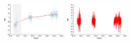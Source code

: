 \documentclass[landscape,a0paper,fontscale=0.346]{baposter} %
\begin{document}
\begin{poster}
{\begin{minipage}[c]{0.33\linewidth}
  \includegraphics[height=5em]{048a_2_data.png}~\includegraphics[height=5em]{048a_2_res.png}
\end{minipage}


}

% 
% 
% 



\end{poster}
\end{document}
